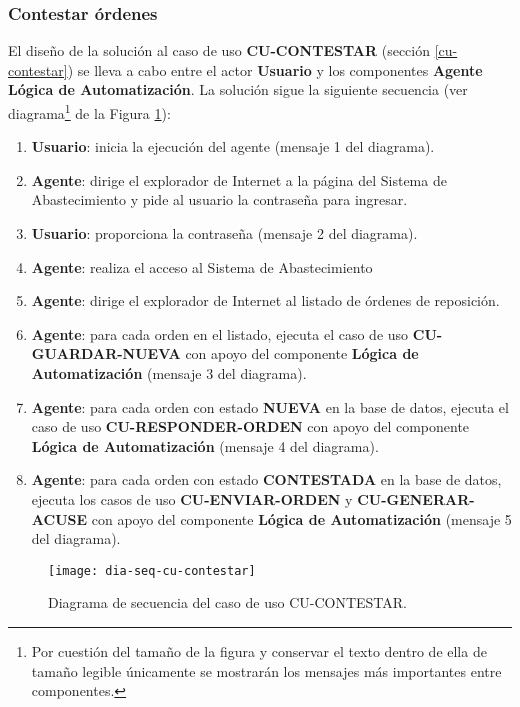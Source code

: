 \subsubsection{Contestar órdenes}
El diseño de la solución al caso de uso \textbf{CU-CONTESTAR} (sección \ref{cu-contestar}) se lleva a cabo entre el actor \textbf{Usuario} y los componentes \textbf{Agente} \textbf{Lógica de Automatización}. La solución sigue la siguiente secuencia (ver diagrama\footnote{Por cuestión del tamaño de la figura y conservar el texto dentro de ella de tamaño legible únicamente se mostrarán los mensajes más importantes entre componentes.} de la Figura \ref{fig:dia-seq-cu-contestar}):
\begin{enumerate}
	\item \textbf{Usuario}: inicia la ejecución del agente (mensaje 1 del diagrama).
	\item \textbf{Agente}: dirige el explorador de Internet a la página del Sistema de Abastecimiento y pide al usuario la contraseña para ingresar.
	\item \textbf{Usuario}: proporciona la contraseña (mensaje 2 del diagrama).
	\item \textbf{Agente}: realiza el acceso al Sistema de Abastecimiento
	\item \textbf{Agente}: dirige el explorador de Internet al listado de órdenes de reposición.
	\item \textbf{Agente}: para cada orden en el listado, ejecuta el caso de uso \textbf{CU-GUARDAR-NUEVA} con apoyo del componente \textbf{Lógica de Automatización} (mensaje 3 del diagrama).
	\item \textbf{Agente}: para cada orden con estado \textbf{NUEVA} en la base de datos, ejecuta el caso de uso \textbf{CU-RESPONDER-ORDEN} con apoyo del componente \textbf{Lógica de Automatización} (mensaje 4 del diagrama).
	\item \textbf{Agente}: para cada orden con estado \textbf{CONTESTADA} en la base de datos, ejecuta los casos de uso \textbf{CU-ENVIAR-ORDEN} y \textbf{CU-GENERAR-ACUSE} con apoyo del componente \textbf{Lógica de Automatización} (mensaje 5 del diagrama).
\end{enumerate}

\begin{figure}[h]
	\centering
	\texttt{[image: dia-seq-cu-contestar]}
	\caption{Diagrama de secuencia del caso de uso CU-CONTESTAR.}
	\label{fig:dia-seq-cu-contestar}
\end{figure}

